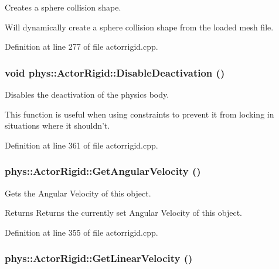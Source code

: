 Creates a sphere collision shape. 

Will dynamically create a sphere collision shape from the loaded mesh file. 

Definition at line 277 of file actorrigid.cpp.

\hypertarget{classphys_1_1ActorRigid_ad74da4da12bbb44b3e5ae22007c98573}{
\subsubsection[{DisableDeactivation}]{\setlength{\rightskip}{0pt plus 5cm}void phys::ActorRigid::DisableDeactivation ()}}
\label{d8/d71/classphys_1_1ActorRigid_ad74da4da12bbb44b3e5ae22007c98573}


Disables the deactivation of the physics body. 

This function is useful when using constraints to prevent it from locking in situations where it shouldn't. 

Definition at line 361 of file actorrigid.cpp.

\hypertarget{classphys_1_1ActorRigid_a54393bf3756324875497960bd9215b2e}{
\subsubsection[{GetAngularVelocity}]{ phys::ActorRigid::GetAngularVelocity ()}}
\label{d8/d71/classphys_1_1ActorRigid_a54393bf3756324875497960bd9215b2e}


Gets the Angular Velocity of this object. 

\begin{DoxyReturn}{Returns}
Returns the currently set Angular Velocity of this object. 
\end{DoxyReturn}


Definition at line 355 of file actorrigid.cpp.

\hypertarget{classphys_1_1ActorRigid_add50c9f86048470de3e04e0de1e0e498}{
\subsubsection[{GetLinearVelocity}]{ phys::ActorRigid::GetLinearVelocity ()}}
\label{d8/d71/classphys_1_1ActorRigid_add50c9f86048470de3e04e0de1e0e498}


